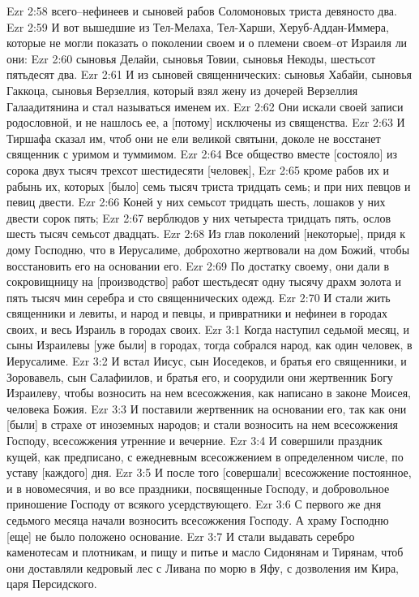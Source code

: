 Ezr 2:58  всего--нефинеев и сыновей рабов Соломоновых триста девяносто два.
Ezr 2:59  И вот вышедшие из Тел-Мелаха, Тел-Харши, Херуб-Аддан-Иммера, которые не могли показать о поколении своем и о племени своем--от Израиля ли они:
Ezr 2:60  сыновья Делайи, сыновья Товии, сыновья Некоды, шестьсот пятьдесят два.
Ezr 2:61  И из сыновей священнических: сыновья Хабайи, сыновья Гаккоца, сыновья Верзеллия, который взял жену из дочерей Верзеллия Галаадитянина и стал называться именем их.
Ezr 2:62  Они искали своей записи родословной, и не нашлось ее, а [потому] исключены из священства.
Ezr 2:63  И Тиршафа сказал им, чтоб они не ели великой святыни, доколе не восстанет священник с уримом и туммимом.
Ezr 2:64  Все общество вместе [состояло] из сорока двух тысяч трехсот шестидесяти [человек],
Ezr 2:65  кроме рабов их и рабынь их, которых [было] семь тысяч триста тридцать семь; и при них певцов и певиц двести.
Ezr 2:66  Коней у них семьсот тридцать шесть, лошаков у них двести сорок пять;
Ezr 2:67  верблюдов у них четыреста тридцать пять, ослов шесть тысяч семьсот двадцать.
Ezr 2:68  Из глав поколений [некоторые], придя к дому Господню, что в Иерусалиме, доброхотно жертвовали на дом Божий, чтобы восстановить его на основании его.
Ezr 2:69  По достатку своему, они дали в сокровищницу на [производство] работ шестьдесят одну тысячу драхм золота и пять тысяч мин серебра и сто священнических одежд.
Ezr 2:70  И стали жить священники и левиты, и народ и певцы, и привратники и нефинеи в городах своих, и весь Израиль в городах своих.
Ezr 3:1  Когда наступил седьмой месяц, и сыны Израилевы [уже были] в городах, тогда собрался народ, как один человек, в Иерусалиме.
Ezr 3:2  И встал Иисус, сын Иоседеков, и братья его священники, и Зоровавель, сын Салафиилов, и братья его, и соорудили они жертвенник Богу Израилеву, чтобы возносить на нем всесожжения, как написано в законе Моисея, человека Божия.
Ezr 3:3  И поставили жертвенник на основании его, так как они [были] в страхе от иноземных народов; и стали возносить на нем всесожжения Господу, всесожжения утренние и вечерние.
Ezr 3:4  И совершили праздник кущей, как предписано, с ежедневным всесожжением в определенном числе, по уставу [каждого] дня.
Ezr 3:5  И после того [совершали] всесожжение постоянное, и в новомесячия, и во все праздники, посвященные Господу, и добровольное приношение Господу от всякого усердствующего.
Ezr 3:6  С первого же дня седьмого месяца начали возносить всесожжения Господу. А храму Господню [еще] не было положено основание.
Ezr 3:7  И стали выдавать серебро каменотесам и плотникам, и пищу и питье и масло Сидонянам и Тирянам, чтоб они доставляли кедровый лес с Ливана по морю в Яфу, с дозволения им Кира, царя Персидского.
